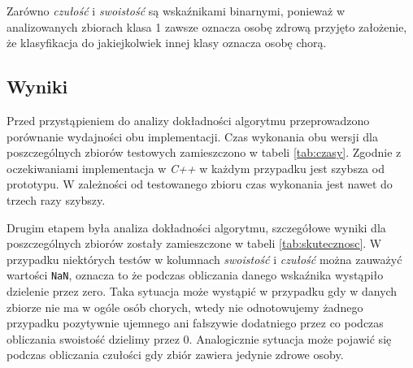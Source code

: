 \noindent Zarówno \textit{czułość} i \textit{swoistość} są wskaźnikami binarnymi, ponieważ w analizowanych zbiorach klasa 1 zawsze oznacza osobę zdrową przyjęto założenie, że klasyfikacja do jakiejkolwiek innej klasy oznacza osobę chorą.

\subsection{Wyniki}
Przed przystąpieniem do analizy dokładności algorytmu przeprowadzono porównanie wydajności obu implementacji. Czas wykonania obu wersji dla poszczególnych zbiorów testowych zamieszczono w tabeli \ref{tab:czasy}. Zgodnie z oczekiwaniami implementacja w \textit{C++} w każdym przypadku jest szybsza od prototypu. W zależności od testowanego zbioru czas wykonania jest nawet do trzech razy szybszy.

Drugim etapem była analiza dokładności algorytmu, szczegółowe wyniki dla poszczególnych zbiorów zostały zamieszczone w tabeli \ref{tab:skutecznosc}.
W przypadku niektórych testów w kolumnach \textit{swoistość} i \textit{czułość} można zauważyć wartości \texttt{NaN}, oznacza to że podczas obliczania danego wskaźnika wystąpiło dzielenie przez zero. Taka sytuacja może wystąpić w przypadku gdy w danych zbiorze nie ma w ogóle osób chorych, wtedy nie odnotowujemy żadnego przypadku pozytywnie ujemnego ani fałszywie dodatniego przez co podczas obliczania swoistość dzielimy przez 0.  Analogicznie sytuacja może pojawić się podczas obliczania czułości gdy zbiór zawiera jedynie zdrowe osoby. 

